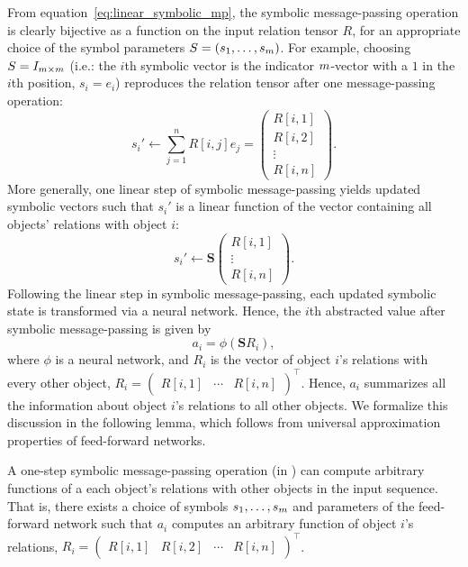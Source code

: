 From equation~\eqref{eq:linear_symbolic_mp}, the symbolic message-passing operation is clearly bijective as a function on the input relation tensor \(R\), for an appropriate choice of the symbol parameters \(S = (s_1,\ldots, s_m)\). For example, choosing \(S = I_{m \times m}\) (i.e.: the \(i\)th symbolic vector is the indicator \(m\)-vector with a \(1\) in the \(i\)th position, \(s_i = e_i\)) reproduces the relation tensor after one message-passing operation:
\begin{equation*}
	s_i'  \leftarrow  \sum_{j=1}^{n} R[i,j] e_j = \begin{pmatrix}R[i,1] \\ R[i,2] \\ \vdots \\ R[i,n]\end{pmatrix}.
\end{equation*}
More generally, one linear step of symbolic message-passing yields updated symbolic vectors such that \(s_i'\) is a linear function of the vector containing all objects' relations with object \(i\):
\begin{equation*}
	s_i' \leftarrow \bm{S} \begin{pmatrix}R[i,1] \\ \vdots \\ R[i,n]\end{pmatrix}.
\end{equation*}
Following the linear step in symbolic message-passing, each updated symbolic state is transformed via a neural network. Hence, the \(i\)th abstracted value after symbolic message-passing is given by
\begin{equation*}
	a_i = \phi\left(\bm{S} R_i \right),
\end{equation*}
where \(\phi\) is a neural network, and \(R_i\) is the vector of object \(i\)'s relations with every other object, \(R_i = \begin{pmatrix}R[i,1] & \cdots & R[i,n]\end{pmatrix}^\top\). Hence, \(a_i\) summarizes all the information about object \(i\)'s relations to all other objects. We formalize this discussion in the following
lemma, which follows from universal approximation properties of feed-forward networks.

\begin{lemma}\label{lemma:function_class_1_step_symbolic_mp}
	\hphantom{~}

	A one-step symbolic message-passing operation (in ) can compute arbitrary functions of a each object's relations with other objects in the input sequence. That is, there exists a choice of symbols \(s_1, \ldots, s _m\) and parameters of the feed-forward network such that \(a_i\) computes an arbitrary function of object \(i\)'s relations, \(R_i = \begin{pmatrix}R[i,1] & R[i,2] & \cdots & R[i,n]\end{pmatrix}^\top\).
\end{lemma}


